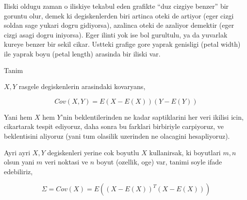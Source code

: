 \documentclass[12pt,fleqn]{article}\usepackage{../common}
\begin{document}
Iliski oldugu zaman o iliskiye tekabul eden grafikte ``duz cizgiye benzer''
bir goruntu olur, demek ki degiskenlerden biri artinca oteki de artiyor
(eger cizgi soldan sage yukari dogru gidiyorsa), azalinca oteki de azaliyor
demektir (eger cizgi asagi dogru iniyorsa). Eger ilinti yok ise bol
gurultulu, ya da yuvarlak kureye benzer bir sekil cikar. Ustteki grafige
gore yaprak genisligi (petal width) ile yaprak boyu (petal length) arasinda
bir iliski var.

Tanim

$X,Y$ rasgele degiskenlerin arasindaki kovaryans,

$$ Cov(X,Y) = E(X-E(X))(Y-E(Y)) $$

Yani hem $X$ hem $Y$'nin beklentilerinden ne kadar saptiklarini her veri
ikilisi icin, cikartarak tespit ediyoruz, daha sonra bu farklari birbiriyle
carpiyoruz, ve beklentisini aliyoruz (yani tum olasilik uzerinden ne
olacagini hesapliyoruz). 

Ayri ayri $X,Y$ degiskenleri yerine cok boyutlu $X$ kullanirsak, ki
boyutlari $m,n$ olsun yani $m$ veri noktasi ve $n$ boyut (ozellik, oge)
var, tanimi soyle ifade edebiliriz,

$$ \Sigma = Cov(X) = E((X-E(X))^T(X-E(X))) $$
\end{document}
